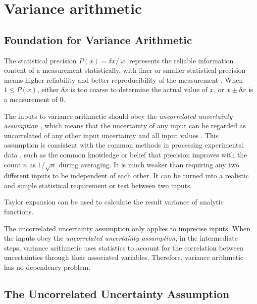 \documentclass[twoside]{article}
\numberwithin{equation}{section}
\begin{document}
\clearpage
\section{Variance arithmetic}
\label{sec: variance arithmetic}


\subsection{Foundation for Variance Arithmetic}

The statistical precision $P(x) = \delta x/|x|$ represents the reliable information content of a measurement statistically, with finer or smaller statistical precision means higher reliability and better reproducibility of the measurement \cite{Statistical_Methods}\cite{Precisions_Physical_Measurements}. 
When $1 \leq P(x)$, either $\delta x$ is too coarse to determine the actual value of $x$, or $x \pm \delta x$ is a measurement of $0$.

The inputs to variance arithmetic should obey the \emph{uncorrelated uncertainty assumption} \cite{Prev_Precision_Arithmetic}, which means that the uncertainty of any input can be regarded as uncorrelated of any other input uncertainty and all input values . 
This assumption is consistent with the common methods in processing experimental data \cite{Statistical_Methods}\cite{Precisions_Physical_Measurements}, such as the common knowledge or belief that precision improves with the count $n$ as $1 / \sqrt{n}$ during averaging.
It is much weaker than requiring any two different inputs to be independent of each other.
It can be turned into a realistic and simple statistical requirement or test between two inputs.

Taylor expansion can be used to calculate the result variance of analytic functions.

The uncorrelated uncertainty assumption only applies to imprecise inputs.
When the inputs obey the \emph{uncorrelated uncertainty assumption}, in the intermediate steps, variance arithmetic uses statistics to account for the correlation between uncertainties through their associated variables.
Therefore, variance arithmetic has no dependency problem.


\subsection{The Uncorrelated Uncertainty Assumption \cite{Prev_Precision_Arithmetic}}
\end{document}
